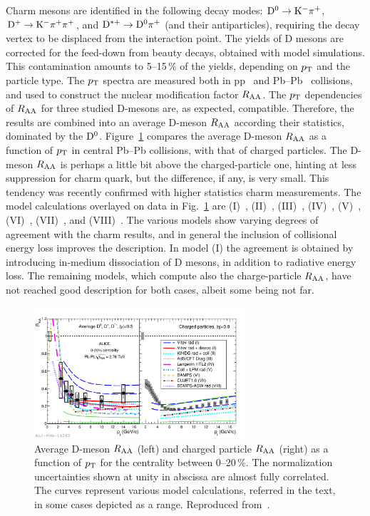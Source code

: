 Charm mesons are identified in the following decay modes: ${\rm D}^0 \rightarrow {\rm K}^-\pi^+$, ${\rm D}^+ \rightarrow {\rm K}^-\pi^+\pi^+$, and ${\rm D}^{*+} \rightarrow {\rm D}^0\pi^+$ (and their antiparticles), requiring the decay vertex to be displaced from the interaction point. The yields of D mesons are corrected for the feed-down from beauty decays, obtained with model simulations. This contamination amounts to 5--15\,\% of the yields, depending on $p_{\rm T}$ and the particle type. The $p_{\rm T}$ spectra are measured both in pp~\cite{} and Pb--Pb~\cite{} collisions, and used to construct the nuclear modification factor $R_{\rm AA}$. The $p_{\rm T}$ dependencies of $R_{\rm AA}$ for three studied D-mesons are, as expected, compatible. Therefore, the results are combined into an average D-meson $R_{\rm AA}$ according their statistics, dominated by the ${\rm D}^0$. Figure~\ref{figks:DmesonRAA} compares the average D-meson $R_{\rm AA}$ as a function of $p_{\rm T}$ in central Pb--Pb collisions, with that of charged particles. The D-meson $R_{\rm AA}$ is perhaps a little bit above the charged-particle one, hinting at less suppression for charm quark, but the difference, if any, is very small. This tendency was recently confirmed with higher statistics charm measurements. The model calculations overlayed on data in Fig.~\ref{figks:DmesonRAA} are (I)~\cite{Sharma:2009hn,He:2011pd}, (II)~\cite{Horowitz:2011cv}, (III)~\cite{Horowitz:2011wm}, (IV)~\cite{Alberico:2011zy,Monteno:2011gq}, (V)~\cite{Gossiaux:2009mk,Gossiaux:2010yx}, (VI)~\cite{Fochler:2011en}, (VII)~\cite{Buzzatti:2011vt}, and (VIII)~\cite{Armesto:2005iq}. The various models show varying degrees of agreement with the charm results, and in general the inclusion of collisional energy loss improves the description. In model (I) the agreement is obtained by introducing in-medium dissociation of D mesons, in addition to radiative energy loss. The remaining models, which compute also the charge-particle $R_{\rm AA}$, have not reached good description for both cases, albeit some being not far.

\begin{figure}
\centering
\includegraphics[width=0.7\textwidth]{ksfigures/DmesonChargedRAAmodels.pdf}
\caption{Average D-meson $R_{\rm AA}$ (left) and charged particle $R_{\rm AA}$ (right) as a function of $p_{\rm T}$ for the centrality between 0--20\,\%. The normalization uncertainties shown at unity in abscissa are almost fully correlated. The curves represent various model calculations, referred in the text, in some cases depicted as a range. Reproduced from~\cite{}.}
\label{figks:DmesonRAA}
\end{figure}

